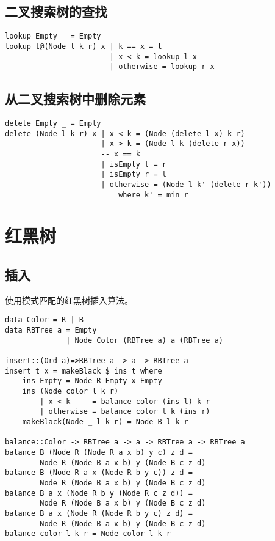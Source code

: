 \documentclass{ctexart}
\begin{document}
\subsection{二叉搜索树的查找}

\begin{lstlisting}
lookup Empty _ = Empty
lookup t@(Node l k r) x | k == x = t
                        | x < k = lookup l x
                        | otherwise = lookup r x
\end{lstlisting}

\subsection{从二叉搜索树中删除元素}

\begin{lstlisting}
delete Empty _ = Empty
delete (Node l k r) x | x < k = (Node (delete l x) k r)
                      | x > k = (Node l k (delete r x))
                      -- x == k
                      | isEmpty l = r
                      | isEmpty r = l
                      | otherwise = (Node l k' (delete r k'))
                          where k' = min r
\end{lstlisting}

\section{红黑树}

\subsection{插入}

使用模式匹配的红黑树插入算法。

\begin{lstlisting}
data Color = R | B
data RBTree a = Empty
              | Node Color (RBTree a) a (RBTree a)

insert::(Ord a)=>RBTree a -> a -> RBTree a
insert t x = makeBlack $ ins t where
    ins Empty = Node R Empty x Empty
    ins (Node color l k r)
        | x < k     = balance color (ins l) k r
        | otherwise = balance color l k (ins r)
    makeBlack(Node _ l k r) = Node B l k r

balance::Color -> RBTree a -> a -> RBTree a -> RBTree a
balance B (Node R (Node R a x b) y c) z d =
        Node R (Node B a x b) y (Node B c z d)
balance B (Node R a x (Node R b y c)) z d =
        Node R (Node B a x b) y (Node B c z d)
balance B a x (Node R b y (Node R c z d)) =
        Node R (Node B a x b) y (Node B c z d)
balance B a x (Node R (Node R b y c) z d) =
        Node R (Node B a x b) y (Node B c z d)
balance color l k r = Node color l k r

\end{lstlisting}
\end{document}
